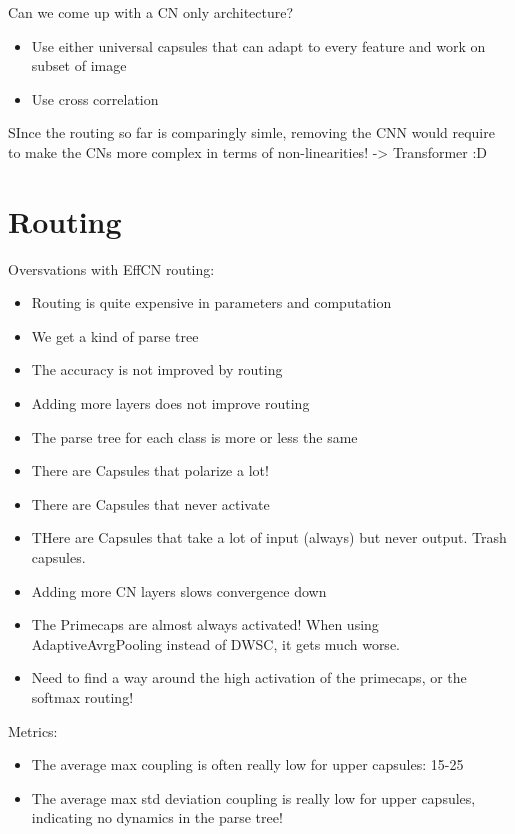 \documentclass{article}
\begin{document}
Can we come up with a CN only architecture?

\begin{itemize}
	\item Use either universal capsules that can adapt to every feature and work on subset of image
	\item Use cross correlation
\end{itemize}

SInce the routing so far is comparingly simle, removing the CNN would require to make the CNs more complex in terms of non-linearities! -> Transformer :D


\section{Routing}

Oversvations with EffCN routing:
\begin{itemize}
	\item Routing is quite expensive in parameters and computation
	\item We get a kind of parse tree
	\item The accuracy is not improved by routing
	\item Adding more layers does not improve routing
	\item The parse tree for each class is more or less the same
	\item There are Capsules that polarize a lot!
	\item There are Capsules that never activate
	\item THere are Capsules that take a lot of input (always) but never output. Trash capsules.
	\item Adding more CN layers slows convergence down
	\item The Primecaps are almost always activated! When using AdaptiveAvrgPooling instead of DWSC, it gets much worse.
	\item Need to find a way around the high activation of the primecaps, or the softmax routing!
\end{itemize}

Metrics:
\begin{itemize}
	\item The average max coupling is often really low for upper capsules: 15-25
	\item The average max std deviation coupling is really low for upper capsules, indicating no dynamics in the parse tree!
\end{itemize}
\end{document}
